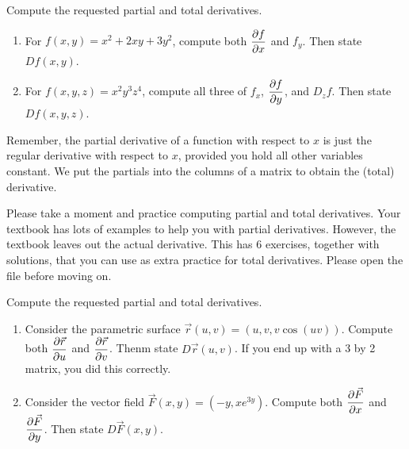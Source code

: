 \begin{problem}
%
Compute the requested partial and total derivatives.
\begin{enumerate}
 \item  For $f(x,y)=x^2+2xy+3y^2$, compute both $\displaystyle\frac{\partial f}{\partial x}$ and $f_y$. Then state $Df(x,y)$. 
 \item  For $f(x,y,z)=x^2y^3z^4$, compute all three of $f_x$, $\displaystyle\frac{\partial f}{\partial y}$, and $D_z f$. Then state $Df(x,y,z)$.
\end{enumerate}
Remember, the partial derivative of a function with respect to $x$ is just the regular derivative with respect to $x$, provided you hold all other variables constant. We put the partials into the columns of a matrix to obtain the (total) derivative.
\end{problem}

Please take a moment and practice computing partial and total derivatives.  Your textbook has lots of examples to help you with partial derivatives. However, the textbook leaves out the actual derivative.  This  has 6 exercises, together with solutions, that you can use as extra practice for total derivatives. Please open the file before moving on.

\begin{problem}
Compute the requested partial and total derivatives.
\begin{enumerate}
 \item  Consider the parametric surface $\vec r(u,v) = (u,v,v\cos(uv))$. Compute both $\displaystyle\frac{\partial \vec r}{\partial u}$ and $\displaystyle\frac{\partial \vec r}{\partial v}$. Thenm state $D\vec r(u,v)$. If you end up with a 3 by 2 matrix, you did this correctly.
 \item  Consider the vector field $\vec F(x,y) = (-y,xe^{3y})$. Compute both $\displaystyle\frac{\partial \vec F}{\partial x}$ and $\displaystyle\frac{\partial \vec F}{\partial y}$. Then state $D\vec F(x,y)$. 
\end{enumerate}
\end{problem}

